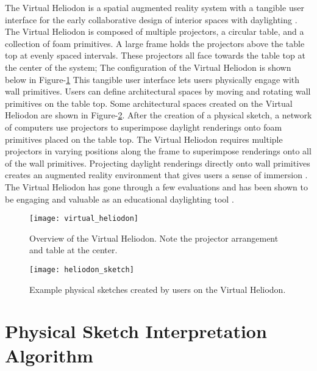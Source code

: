 The Virtual Heliodon is a spatial augmented reality system with a tangible user interface for the early collaborative design of interior spaces with daylighting \cite{sheng2009virtual, cutler2009inferring,nasman2013physical}.  The Virtual Heliodon is composed of multiple projectors, a circular table, and a collection of foam primitives.  A large frame holds the projectors above the table top at evenly spaced intervals.  These projectors all face towards the table top at the center of the system; The configuration of the Virtual Heliodon is shown below in Figure-\ref{fig:virtual_heliodon} This tangible user interface lets users physically engage with wall primitives.  Users can define architectural spaces by moving and rotating wall primitives on the table top.  Some architectural spaces created on the Virtual Heliodon are shown in Figure-\ref{fig:heliodon_sketch}.  After the creation of a physical sketch, a network of computers use projectors to superimpose daylight renderings onto foam primitives placed on the table top.  The Virtual Heliodon requires multiple projectors in varying positions along the frame to superimpose renderings onto all of the wall primitives.  Projecting daylight renderings directly onto wall primitives creates an augmented reality environment that gives users a sense of immersion \cite{nasman2013physical}.  The Virtual Heliodon has gone through a few evaluations and has
been shown to be engaging and valuable as an educational daylighting tool \cite{nasman2013physical}. \\

\begin{figure}[h]
\centering
\texttt{[image: virtual\_heliodon]}
\caption[Overiew of the Virtual Heliodon.]{Overview of the Virtual Heliodon. Note the projector arrangement and table at the center.}
\label{fig:virtual_heliodon}
\end{figure}

\begin{figure}[h]
\centering
\texttt{[image: heliodon\_sketch]}
\caption{Example physical sketches created by users on the Virtual Heliodon.}
\label{fig:heliodon_sketch}
\end{figure}

\section{Physical Sketch Interpretation Algorithm}

